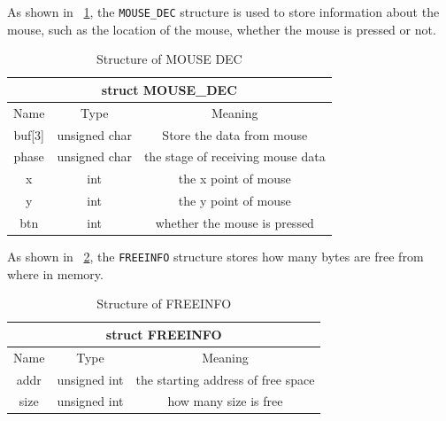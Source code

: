 \documentclass{swfcthesis}
\begin{document}
As shown in ~\ref{tab:MOUSE-DEC}, the \texttt{MOUSE\_DEC} structure is used to store
information about the mouse, such as the location of the mouse, whether the mouse is
pressed or not.

\begin{table}[!htbp]
  \centering
  \begin{tabular}[c]{|c|c|c|}
    \hline
    \multicolumn{3}{|c|}{struct MOUSE\_DEC} \\
    \hline
    Name & Type & Meaning \\
    \hline
    buf[3] & unsigned char & Store the data from mouse \\
    \hline
    phase & unsigned char & the stage of receiving mouse data \\
    \hline
    x & int & the x point of mouse \\
    \hline
    y & int & the y point of mouse \\
    \hline
    btn & int & whether the mouse is pressed \\
    \hline
  \end{tabular}
  \caption{Structure of MOUSE DEC}
  \label{tab:MOUSE-DEC}
\end{table}

As shown in ~\ref{tab:FREEINFO}, the \texttt{FREEINFO} structure stores how many bytes are
free from where in memory.

\begin{table}[!htbp]
  \centering
  \begin{tabular}[c]{|c|c|c|}
    \hline
    \multicolumn{3}{|c|}{struct FREEINFO} \\
    \hline
    Name & Type & Meaning \\
    \hline
    addr & unsigned int & the starting address of free space \\
    \hline
    size & unsigned int & how many size is free \\
    \hline
  \end{tabular}
  \caption{Structure of FREEINFO}
  \label{tab:FREEINFO}
\end{table}
\end{document}
